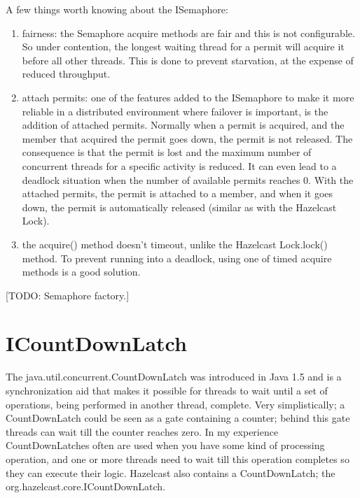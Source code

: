 A few things worth knowing about the ISemaphore:
\begin{enumerate}
\item fairness: the Semaphore acquire methods are fair and this is not configurable. So under contention, the longest waiting thread for a permit will acquire it before all other threads. This is done to prevent starvation, at the expense of reduced throughput.
\item attach permits: one of the features added to the ISemaphore to make it more reliable in a distributed environment where failover is important, is the addition of attached permits. Normally when a permit is acquired, and the member that acquired the permit goes down, the permit is not released. The consequence is that the permit is lost and the maximum number of concurrent threads for a specific activity is reduced. It can even lead to a deadlock situation when the number of available permits reaches 0. With the attached permits, the permit is attached to a member, and when it goes down, the permit is automatically released (similar as with the Hazelcast Lock).
\item the acquire() method doesn't timeout, unlike the Hazelcast Lock.lock() method. To prevent running into a deadlock, using one of timed acquire methods is a good solution.
\end{enumerate}

[TODO: Semaphore factory.]

\section{ICountDownLatch}
The java.util.concurrent.CountDownLatch was introduced in Java 1.5 and is a synchronization aid that makes it possible for threads to wait until a set of operations, being performed in another thread, complete. Very simplistically; a CountDownLatch could be seen as a gate containing a counter; behind this gate threads can wait till the counter reaches zero. In my experience CountDownLatches often are used when you have some kind of processing operation, and one or more threads need to wait till this operation completes so they can execute their logic. Hazelcast also contains a CountDownLatch; the org.hazelcast.core.ICountDownLatch.

